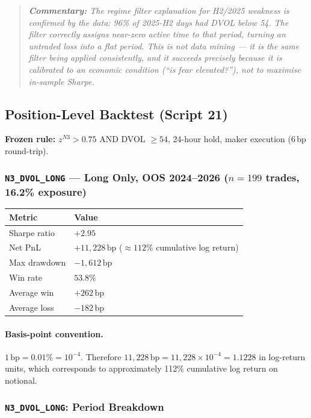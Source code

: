 \documentclass[11pt,a4paper]{article}
\newcommand{\code}[1]{\texttt{#1}}
\newcommand{\comment}[1]{%
  \begin{quote}
    \small\itshape\textbf{Commentary:} #1
  \end{quote}
}
\begin{document}
\comment{The regime filter explanation for H2/2025 weakness is confirmed by the data: 96\% of 2025-H2 days had DVOL below 54. The filter correctly assigns near-zero active time to that period, turning an untraded loss into a flat period. This is not data mining --- it is the same filter being applied consistently, and it succeeds precisely because it is calibrated to an economic condition (``is fear elevated?''), not to maximise in-sample Sharpe.}

\subsection{Position-Level Backtest (Script 21)}

\textbf{Frozen rule:} $z^{N3} > 0.75$ AND DVOL $\geq 54$, 24-hour hold, maker execution (6\,bp round-trip).

\subsubsection*{\code{N3\_DVOL\_LONG} --- Long Only, OOS 2024--2026 ($n = 199$ trades, 16.2\% exposure)}

\begin{center}
\begin{tabular}{@{}ll@{}}
\toprule
\textbf{Metric} & \textbf{Value} \\
\midrule
Sharpe ratio & $+2.95$ \\
Net PnL & $+11{,}228\,\text{bp}$ ($\approx 112\%$ cumulative log return) \\
Max drawdown & $-1{,}612\,\text{bp}$ \\
Win rate & $53.8\%$ \\
Average win & $+262\,\text{bp}$ \\
Average loss & $-182\,\text{bp}$ \\
\bottomrule
\end{tabular}
\end{center}

\paragraph{Basis-point convention.}
$1\,\text{bp} = 0.01\% = 10^{-4}$.
Therefore $11{,}228\,\text{bp} = 11{,}228 \times 10^{-4} = 1.1228$ in log-return units, which corresponds to approximately 112\% cumulative log return on notional.

\subsubsection*{\code{N3\_DVOL\_LONG}: Period Breakdown}
\end{document}
